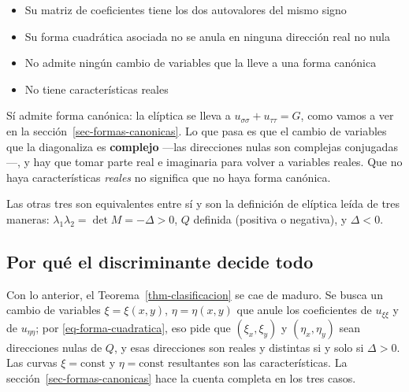 \documentclass[
  spanish,
  a4paper,
]{scrbook}
\providecommand{\tightlist}{%
  \setlength{\itemsep}{0pt}\setlength{\parskip}{0pt}}
\theoremstyle{definition}
\theoremstyle{plain}
\theoremstyle{definition}
\theoremstyle{plain}
\theoremstyle{definition}
\theoremstyle{remark}
\begin{document}
\begin{itemize}
\tightlist
\item
  {Su matriz de coeficientes tiene los dos autovalores del mismo signo}
\item
  {Su forma cuadrática asociada no se anula en ninguna dirección real no
  nula}
\item
  {No admite ningún cambio de variables que la lleve a una forma
  canónica}
\item
  {No tiene características reales}
\end{itemize}

Sí admite forma canónica: la elíptica se lleva a
\(u_{\sigma\sigma} + u_{\tau\tau} = G\), como vamos a ver en la
sección~\ref{sec-formas-canonicas}. Lo que pasa es que el cambio de
variables que la diagonaliza es \textbf{complejo} ---las direcciones
nulas son complejas conjugadas---, y hay que tomar parte real e
imaginaria para volver a variables reales. Que no haya características
\emph{reales} no significa que no haya forma canónica.

Las otras tres son equivalentes entre sí y son la definición de elíptica
leída de tres maneras: \(\lambda_1\lambda_2 = \det M = -\Delta > 0\),
\(Q\) definida (positiva o negativa), y \(\Delta < 0\).

\subsection{Por qué el discriminante decide
todo}\label{sec-demostracion-clasificacion}

Con lo anterior, el Teorema~\ref{thm-clasificacion} se cae de maduro. Se
busca un cambio de variables \(\xi = \xi(x,y)\), \(\eta = \eta(x,y)\)
que anule los coeficientes de \(u_{\xi\xi}\) y de \(u_{\eta\eta}\); por
\ref{eq-forma-cuadratica}, eso pide que \((\xi_x,\xi_y)\) y
\((\eta_x,\eta_y)\) sean direcciones nulas de \(Q\), y esas direcciones
son reales y distintas si y solo si \(\Delta > 0\). Las curvas
\(\xi = \text{const}\) y \(\eta = \text{const}\) resultantes son las
características. La sección~\ref{sec-formas-canonicas} hace la cuenta
completa en los tres casos.
\end{document}
